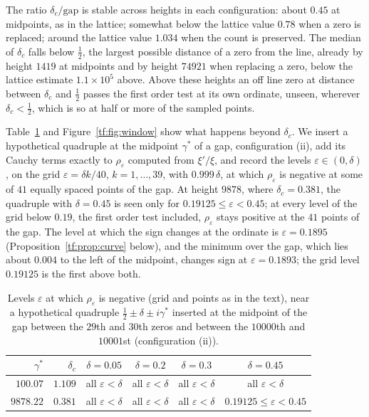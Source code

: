 The ratio $\delta_c/\mathrm{gap}$ is stable across heights in each configuration: about $0.45$ at midpoints, as in the lattice; somewhat below the lattice value $0.78$ when a zero is replaced; around the lattice value $1.034$ when the count is preserved. The median of $\delta_c$ falls below $\tfrac12$, the largest possible distance of a zero from the line, already by height $1419$ at midpoints and by height $74921$ when replacing a zero, below the lattice estimate $1.1\times10^5$ above. Above these heights an off line zero at distance between $\delta_c$ and $\tfrac12$ passes the first order test at its own ordinate, unseen, wherever $\delta_c<\tfrac12$, which is so at half or more of the sampled points.

Table~\ref{tf:tab:window} and Figure~\ref{tf:fig:window} show what happens beyond $\delta_c$. We insert a hypothetical quadruple at the midpoint $\gamma^*$ of a gap, configuration (ii), add its Cauchy terms exactly to $\rho_\varepsilon$ computed from $\xi'/\xi$, and record the levels $\varepsilon\in(0,\delta)$, on the grid $\varepsilon=\delta k/40$, $k=1,\dots,39$, with $0.999\,\delta$, at which $\rho_\varepsilon$ is negative at some of $41$ equally spaced points of the gap. At height $9878$, where $\delta_c=0.381$, the quadruple with $\delta=0.45$ is seen only for $0.19125\le\varepsilon<0.45$; at every level of the grid below $0.19$, the first order test included, $\rho_\varepsilon$ stays positive at the $41$ points of the gap. The level at which the sign changes at the ordinate is $\varepsilon=0.1895$ (Proposition~\ref{tf:prop:curve} below), and the minimum over the gap, which lies about $0.004$ to the left of the midpoint, changes sign at $\varepsilon=0.1893$; the grid level $0.19125$ is the first above both.

\begin{table}[htbp]
\centering\footnotesize
\setlength{\tabcolsep}{4pt}
\begin{tabular}{@{}rrcccc@{}}
\toprule
$\gamma^*$ & $\delta_c$ & $\delta=0.05$ & $\delta=0.2$ & $\delta=0.3$ & $\delta=0.45$\\
\midrule
$100.07$ & $1.109$ & all $\varepsilon<\delta$ & all $\varepsilon<\delta$ & all $\varepsilon<\delta$ & all $\varepsilon<\delta$\\
$9878.22$ & $0.381$ & all $\varepsilon<\delta$ & all $\varepsilon<\delta$ & all $\varepsilon<\delta$ & $0.19125\le\varepsilon<0.45$\\
\bottomrule
\end{tabular}
\caption{Levels $\varepsilon$ at which $\rho_\varepsilon$ is negative (grid and points as in the text), near a hypothetical quadruple $\tfrac12\pm\delta\pm i\gamma^*$ inserted at the midpoint of the gap between the $29$th and $30$th zeros and between the $10000$th and $10001$st (configuration (ii)).}
\label{tf:tab:window}
\end{table}


